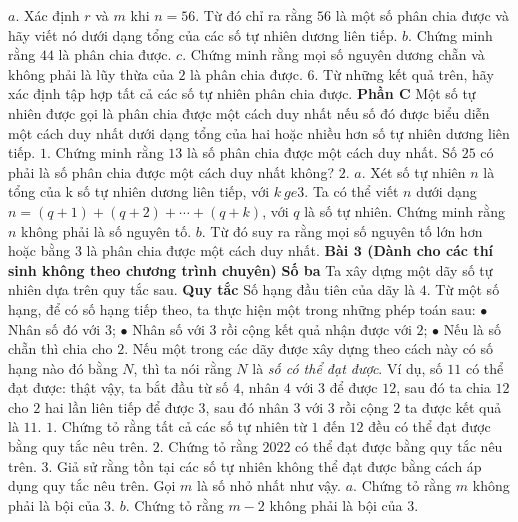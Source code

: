 \begin{multicols}{2}
	\vskip 0.1cm
	$a.$ Xác định $r$ và $m$ khi $n=56$. Từ đó chỉ ra rằng $56$ là một số phân chia được và hãy viết nó dưới dạng tổng của các số tự nhiên dương liên tiếp.
	\vskip 0.1cm
	$b.$ Chứng minh rằng $44$ là phân chia được.
	\vskip 0.1cm
	$c.$ Chứng minh rằng mọi  số nguyên dương chẵn và không phải là lũy thừa của $2$ là phân chia được. 
	\vskip 0.1cm
	$6.$ Từ những kết quả trên, hãy xác định tập hợp tất cả các số tự nhiên phân chia được.
	\vskip 0.1cm
	\textbf{\color{cackithi}Phần C}
	\vskip 0.1cm
	Một số tự nhiên được gọi là phân chia được một cách duy nhất nếu số đó được biểu diễn một cách duy nhất dưới dạng tổng của hai hoặc nhiều hơn số tự nhiên dương liên tiếp.
	\vskip 0.1cm
	$1.$ Chứng minh rằng $13$ là số phân chia được một cách duy nhất. Số $25$ có phải là số phân chia được một cách duy nhất không?
	\vskip 0.1cm
	$2.$ $a.$ Xét số tự nhiên $n$ là tổng của k số tự nhiên dương liên tiếp, với $k\ ge3$. Ta có thể viết $n$ dưới dạng  $n=(q+1)+(q+2)+\cdots+(q+k)$, với $q$ là số tự nhiên. Chứng minh rằng $n$ không phải là số nguyên tố.
	\vskip 0.1cm
	$b$. Từ đó suy ra rằng mọi số nguyên tố lớn hơn hoặc bằng $3$ là phân chia được một cách duy nhất.
	\vskip 0.1cm
	\textbf{\color{cackithi}Bài $\pmb{3}$ (Dành cho các thí sinh không theo chương trình chuyên)}
	\vskip 0.1cm
		\textbf{\color{cackithi}Số ba}
	\vskip 0.1cm
	Ta xây dựng một dãy số tự nhiên dựa trên quy tắc sau.
	\vskip 0.1cm
	\textbf{\color{cackithi}Quy tắc}
	\vskip 0.1cm
	Số hạng đầu tiên của dãy là $4$.
	\vskip 0.1cm
	Từ một số hạng, để có số hạng tiếp theo, ta thực hiện một trong những phép toán sau:
	\vskip 0.1cm 
	$\bullet$ Nhân số đó với $3$;
	\vskip 0.1cm
	$\bullet$ Nhân số với $3$ rồi cộng kết quả nhận được với $2$;
	\vskip 0.1cm
	$\bullet$ Nếu là số chẵn thì chia cho $2$.
	\vskip 0.1cm
	Nếu một trong các dãy được xây dựng theo cách này có số hạng nào đó bằng $N$, thì ta nói rằng $N$ là \textit{số có thể đạt được}.
	\vskip 0.1cm 
	Ví dụ, số $11$ có thể đạt được: thật vậy, ta bắt đầu từ số $4$, nhân $4$ với $3$ để được $12$, sau đó ta chia $12$ cho $2$ hai lần liên tiếp để được $3$, sau đó nhân $3$ với $3$ rồi cộng $2$ ta được kết quả là $11$.
	\vskip 0.1cm 
	$1.$ Chứng tỏ rằng tất cả các số tự nhiên từ $1$ đến $12$ đều có thể đạt được bằng quy tắc nêu trên. 
	\vskip 0.1cm
	$2.$ Chứng tỏ rằng $2022$ có thể đạt được bằng quy tắc nêu trên. 
	\vskip 0.1cm
	$3.$ Giả sử rằng tồn tại các số tự nhiên không thể đạt được bằng cách áp dụng quy tắc nêu trên. Gọi $m$ là số nhỏ nhất như vậy.
	\vskip 0.1cm
	$a.$ Chứng tỏ rằng $m$ không phải là bội của $3$.
	\vskip 0.1cm
	$b.$ Chứng tỏ rằng $m-2$ không phải là bội của $3$.

\end{multicols}

